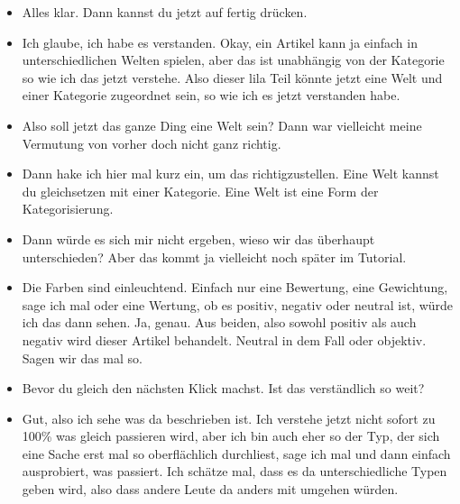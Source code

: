 {\begin{itemize}[]
              Hier kommt jetzt nur eins dazu, weil der Rindfleischburger quasi sonst doppelt gezählt werden würde.
              Deswegen hätte ich hier nur eins hinzugefügt.
              Wäre dann in dem Fall fünf.
              Genau, und welche Kategorie hat der Gegenstand Hafer?
              Getreide.
        \item {} Alles klar.
              Dann kannst du jetzt auf fertig drücken.
        \item {} Ich glaube, ich habe es verstanden.
              Okay, ein Artikel kann ja einfach in unterschiedlichen Welten spielen, aber das ist unabhängig von der Kategorie so wie ich das jetzt verstehe.
              Also dieser lila Teil könnte jetzt eine Welt und einer Kategorie zugeordnet sein, so wie ich es jetzt verstanden habe.
        \item {} Also soll jetzt das ganze Ding eine Welt sein?
              Dann war vielleicht meine Vermutung von vorher doch nicht ganz richtig.
        \item {} Dann hake ich hier mal kurz ein, um das richtigzustellen.
              Eine Welt kannst du gleichsetzen mit einer Kategorie.
              Eine Welt ist eine Form der Kategorisierung.
        \item {} Dann würde es sich mir nicht ergeben, wieso wir das überhaupt unterschieden?
              Aber das kommt ja vielleicht noch später im Tutorial.
        \item {} Die Farben sind einleuchtend.
              Einfach nur eine Bewertung, eine Gewichtung, sage ich mal oder eine Wertung, ob es positiv, negativ oder neutral ist, würde ich das dann sehen.
              Ja, genau.
              Aus beiden, also sowohl positiv als auch negativ wird dieser Artikel behandelt.
              Neutral in dem Fall oder objektiv.
              Sagen wir das mal so.
        \item {} Bevor du gleich den nächsten Klick machst.
              Ist das verständlich so weit?
        \item {} Gut, also ich sehe was da beschrieben ist.
              Ich verstehe jetzt nicht sofort zu 100\% was gleich passieren wird, aber ich bin auch eher so der Typ, der sich eine Sache erst mal so oberflächlich durchliest, sage ich mal und dann einfach ausprobiert, was passiert.
              Ich schätze mal, dass es da unterschiedliche Typen geben wird, also dass andere Leute da anders mit umgehen würden.

\end{itemize}}
